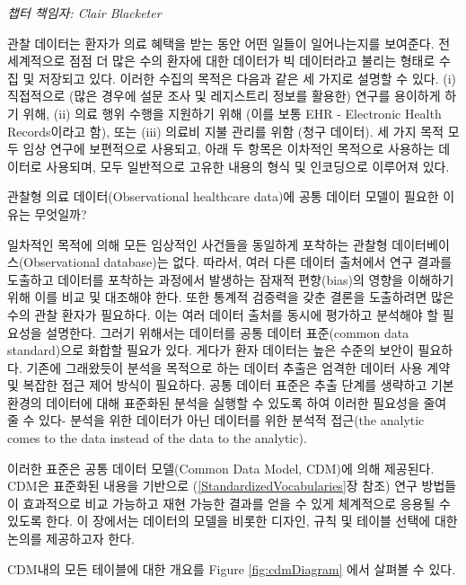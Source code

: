 \documentclass[11pt]{book}
\theoremstyle{definition}
\theoremstyle{definition}
\theoremstyle{definition}
\theoremstyle{remark}
\begin{document}
\emph{챕터 책임자: Clair Blacketer}

관찰 데이터는 환자가 의료 혜택을 받는 동안 어떤 일들이 일어나는지를
보여준다. 전 세계적으로 점점 더 많은 수의 환자에 대한 데이터가 빅
데이터라고 불리는 형태로 수집 및 저장되고 있다. 이러한 수집의 목적은
다음과 같은 세 가지로 설명할 수 있다. (i) 직접적으로 (많은 경우에 설문
조사 및 레지스트리 정보를 활용한) 연구를 용이하게 하기 위해, (ii) 의료
행위 수행을 지원하기 위해 (이를 보통 EHR - Electronic Health
Records이라고 함), 또는 (iii) 의료비 지불 관리를 위함 (청구 데이터). 세
가지 목적 모두 임상 연구에 보편적으로 사용되고, 아래 두 항목은 이차적인
목적으로 사용하는 데이터로 사용되며, 모두 일반적으로 고유한 내용의 형식
및 인코딩으로 이루어져 있다. 

관찰형 의료 데이터(Observational healthcare data)에 공통 데이터 모델이
필요한 이유는 무엇일까?

일차적인 목적에 의해 모든 임상적인 사건들을 동일하게 포착하는 관찰형
데이터베이스(Observational database)는 없다. 따라서, 여러 다른 데이터
출처에서 연구 결과를 도출하고 데이터를 포착하는 과정에서 발생하는 잠재적
편향(bias)의 영향을 이해하기 위해 이를 비교 및 대조해야 한다. 또한
통계적 검증력을 갖춘 결론을 도출하려면 많은 수의 관찰 환자가 필요하다.
이는 여러 데이터 출처를 동시에 평가하고 분석해야 할 필요성을 설명한다.
그러기 위해서는 데이터를 공통 데이터 표준(common data standard)으로
화합할 필요가 있다. 게다가 환자 데이터는 높은 수준의 보안이 필요하다.
기존에 그래왔듯이 분석을 목적으로 하는 데이터 추출은 엄격한 데이터 사용
계약 및 복잡한 접근 제어 방식이 필요하다. 공통 데이터 표준은 추출 단계를
생략하고 기본 환경의 데이터에 대해 표준화된 분석을 실행할 수 있도록 하여
이러한 필요성을 줄여 줄 수 있다- 분석을 위한 데이터가 아닌 데이터를 위한
분석적 접근(the analytic comes to the data instead of the data to the
analytic).

이러한 표준은 공통 데이터 모델(Common Data Model, CDM)에 의해 제공된다.
CDM은 표준화된 내용을 기반으로 (\ref{StandardizedVocabularies}장 참조)
연구 방법들이 효과적으로 비교 가능하고 재현 가능한 결과를 얻을 수 있게
체계적으로 응용될 수 있도록 한다. 이 장에서는 데이터의 모델을 비롯한
디자인, 규칙 및 테이블 선택에 대한 논의를 제공하고자 한다.

CDM내의 모든 테이블에 대한 개요를 Figure \ref{fig:cdmDiagram}
에서 살펴볼 수 있다.
\end{document}
